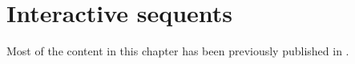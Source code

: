 \setchapterpreamble[u]{\margintoc}
\chapter{Interactive sequents}

\begin{kaobox}[frametitle=Note]
  Most of the content in this chapter has been previously published in
  \cite{10.1145/3497775.3503692}.
\end{kaobox}





